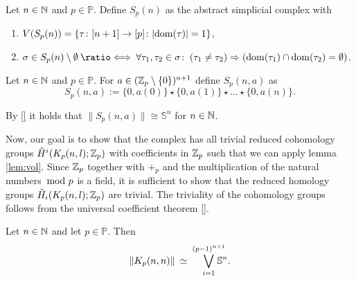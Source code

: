 \begin{defin}
  Let $n \in \mathbb{N}$ and $p \in \mathbb{P}$. Define $S_p(n)$ as the abstract simplicial complex with
  \begin{enumerate}[label=\roman*.)]
    \item $V(S_p(n)) = \{\tau\colon [n+1]\to [p]\colon |{\rm dom}(\tau)| = 1\}$,
    \item $\sigma \in S_p(n)\setminus\emptyset \: \longeq \: \forall \tau_1,\tau_2\in\sigma\colon \: (\tau_1 \neq \tau_2) \Rightarrow (\dom(\tau_1) \cap \dom(\tau_2) = \emptyset)$.
  \end{enumerate}
\end{defin}

\begin{defin}
  Let $n \in \mathbb{N}$ and $p\in\mathbb{P}$. For $a \in (\mathbb{Z}_p\setminus\{0\})^{n+1}$ define $S_p(n,a)$ as
  \begin{equation*}
    S_p(n,a) := \{0, a(0)\} \star \{0,a(1)\} \star \ldots \star \{0,a(n)\}.
  \end{equation*}
\end{defin}

\begin{rem}\label{rem:s}
  By \ref{} it holds that $\lVert S_p(n,a) \rVert \cong \mathbb{S}^{n}$ for $n\in\mathbb{N}$.
\end{rem}

Now, our goal is to show that the complex has all trivial reduced cohomology groups $\tilde{H}^i(K_p(n,l); \mathbb{Z}_p)$ with coefficients in $\mathbb{Z}_p$ such that we can apply lemma \ref{lem:vol}. Since $\mathbb{Z}_p$ together with $+_p$ and the multiplication of the natural numbers $\hspace*{-5px}\mod p$ is a field, it is sufficient to show that the reduced homology groups $\tilde{H}_i(K_p(n,l); \mathbb{Z}_p)$ are trivial. The triviality of the cohomology groups follows from the universal coefficient theorem \ref{}. 

\begin{lemma}
  Let $n \in \mathbb{N}$ and let $p \in \mathbb{P}$. Then
  \begin{equation*}
    \lVert K_p(n,n) \rVert \: \simeq \: \bigvee_{i=1}^{(p-1)^{n+1}}\hspace*{-10px}\mathbb{S}^{n}.
  \end{equation*}
\end{lemma}

